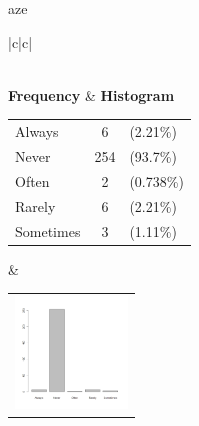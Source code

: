 aze 
  \begin{center}
    \addtolength{\leftskip}{-4cm}\addtolength{\rightskip}{-4cm}
    \begin{tabular}{|c|c|}

      \hline
        \\
      \hline
        {\bf Frequency} & {\bf Histogram}  \\
          \begin{tabular}{@{}l@{ : }cl@{}}
            Always & 6 &(2.21\%) \\
            Never & 254 &(93.7\%) \\
            Often & 2 &(0.738\%) \\
            Rarely & 6 &(2.21\%) \\
            Sometimes & 3 &(1.11\%) \\
          \end{tabular}
      &
          \begin{tabular}{@{}l@{}}
            \includegraphics[width=3cm]{graphUniv/V17-barplot}
          \end{tabular}
      \\ \hline 

    \end{tabular}
  \end{center}
  
  



